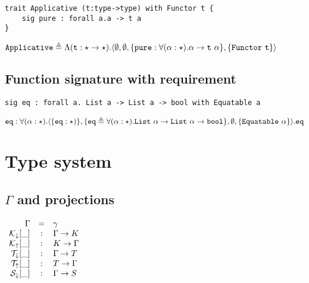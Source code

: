 \documentclass{article}[11pt]
\newcommand{\term}[1]{\verb~#1~}
\begin{document}
    \begin{verbatim}
trait Applicative (t:type->type) with Functor t {
    sig pure : forall a.a -> t a
}
    \end{verbatim}

    \noindent
    \begin{math}
        \term{Applicative} \triangleq \Lambda(\term{t}:\star \rightarrow \star).
        \langle
        \emptyset,
        \emptyset,
        \{ \term{pure} : \forall(\alpha:\star).\alpha \rightarrow \term{t}~\alpha \},
        \{ \term{Functor}~\term{t} \}
        \rangle
    \end{math}

    \subsection{Function signature with requirement}\label{subsec:function-signature-with-requirement}

    \begin{verbatim}
sig eq : forall a. List a -> List a -> bool with Equatable a
    \end{verbatim}

    \noindent
    \begin{math}
        \term{eq} : \forall(\alpha:\star).\langle
        \{ \term{eq} : \star)\},
        \{ \term{eq} \triangleq \forall(\alpha:\star).\term{List}~\alpha \rightarrow \term{List}~\alpha \rightarrow \term{bool} \},
        \emptyset,
        \{ \term{Equatable} ~ \alpha \}
        \rangle.\term{eq}
    \end{math}


    \section{Type system}\label{sec:type-system}

    \subsection{$\Gamma$ and projections}\label{subsec:gamma-and-projections}

    \begin{math}
        \begin{array}{rcl}
            \Gamma                  & = & \gamma \\
            {\cal K}_\downarrow[\_] & : & \Gamma \rightarrow K \\
            {\cal K}_\uparrow[\_]   & : & K \rightarrow \Gamma \\
            {\cal T}_\downarrow[\_] & : & \Gamma \rightarrow T \\
            {\cal T}_\uparrow[\_]   & : & T \rightarrow \Gamma \\
            {\cal S}_\downarrow[\_] & : & \Gamma \rightarrow S \\
        \end{array}
    \end{math}
\end{document}
